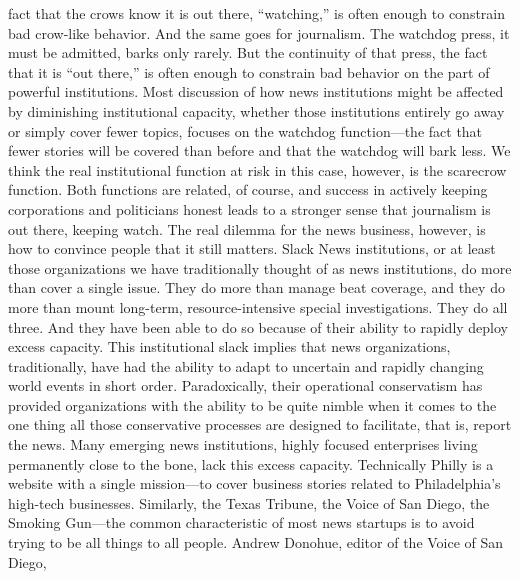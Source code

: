fact that the crows know it is out there, ``watching,'' is often enough to constrain
bad crow-like behavior. And the same goes for journalism. The watchdog press,
it must be admitted, barks only rarely. But the continuity of that press, the fact
that it is ``out there,'' is often enough to constrain bad behavior on the part of
powerful institutions.
Most discussion of how news institutions might be affected by diminishing institutional
capacity, whether those institutions entirely go away or simply cover
fewer topics, focuses on the watchdog function—the fact that fewer stories will
be covered than before and that the watchdog will bark less. We think the real
institutional function at risk in this case, however, is the scarecrow function. Both
functions are related, of course, and success in actively keeping corporations and
politicians honest leads to a stronger sense that journalism is out there, keeping
watch. The real dilemma for the news business, however, is how to convince
people that it still matters.
Slack
News institutions, or at least those organizations we have traditionally thought of
as news institutions, do more than cover a single issue. They do more than manage
beat coverage, and they do more than mount long-term, resource-intensive
special investigations. They do all three. And they have been able to do so because
of their ability to rapidly deploy excess capacity. This institutional slack implies
that news organizations, traditionally, have had the ability to adapt to uncertain
and rapidly changing world events in short order. Paradoxically, their operational
conservatism has provided organizations with the ability to be quite nimble
when it comes to the one thing all those conservative processes are designed to
facilitate, that is, report the news.
Many emerging news institutions, highly focused enterprises living permanently
close to the bone, lack this excess capacity. Technically Philly is a website with
a single mission—to cover business stories related to Philadelphia’s high-tech
businesses. Similarly, the Texas Tribune, the Voice of San Diego, the Smoking
Gun—the common characteristic of most news startups is to avoid trying to
be all things to all people. Andrew Donohue, editor of the Voice of San Diego,

